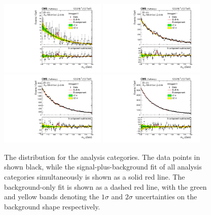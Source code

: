 \begin{figure}[ht!]
\centering
\includegraphics[width=0.45\textwidth]{statandresultsFigures/S_SB_ProfileMH_UntaggedTag_0_13TeV.pdf} 
\includegraphics[width=0.45\textwidth]{statandresultsFigures/S_SB_ProfileMH_UntaggedTag_1_13TeV.pdf}\\ 
\includegraphics[width=0.45\textwidth]{statandresultsFigures/S_SB_ProfileMH_UntaggedTag_2_13TeV.pdf} 
\includegraphics[width=0.45\textwidth]{statandresultsFigures/S_SB_ProfileMH_UntaggedTag_3_13TeV.pdf} \\
\caption{The \mgg distribution for the \Untagged analysis categories. The data points in shown black, while the signal-plus-background fit of all analysis categories simultaneously is shown as a solid red line. The background-only fit is shown as a dashed red line, with the green and yellow bands denoting the $1\sigma$ and $2\sigma$ uncertainties on the background shape respectively.}

\label{fig:statandresults:s_b_fits}
\end{figure}

